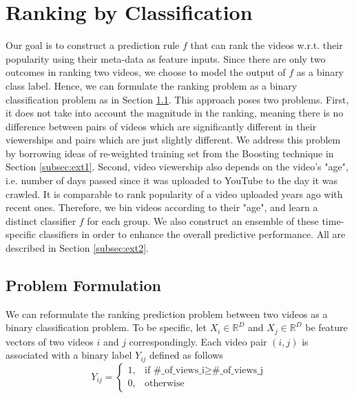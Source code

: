 \section{Ranking by Classification}
\label{sec:ranking}	
	Our goal is to construct a prediction rule $f$ that can rank the videos w.r.t. their popularity using their meta-data as feature inputs. Since there are only two outcomes in ranking two videos, we choose to model the output of $f$ as a binary class label. Hence, we can formulate the ranking problem as a binary classification problem as in Section \ref{subsec:probFormulation}. This approach poses two problems. First, it does not take into account the magnitude in the ranking, meaning there is no difference between pairs of videos which are significantly different in their viewerships and pairs which are just slightly different. We address this problem by borrowing ideas of re-weighted training set from the Boosting technique in Section \ref{subsec:ext1}. Second, video viewership also depends on the video's "age", i.e. number of days passed since it was uploaded to YouTube to the day it was crawled. It is comparable to rank popularity of a video uploaded years ago with recent ones. Therefore, we bin videos according to their "age", and learn a distinct classifier $f$ for each group. We also construct an ensemble of these time-specific classifiers in order to enhance the overall predictive performance. All are described in Section \ref{subsec:ext2}.

\subsection{Problem Formulation}
\label{subsec:probFormulation}
We can reformulate the ranking prediction problem between two videos as a binary classification problem. To be specific, let $X_i \in \mathbb{R}^D$ and $X_j \in \mathbb{R}^D$ be feature vectors of two videos $i$ and $j$ correspondingly. Each video pair $(i, j)$ is associated with a binary label $Y_{ij}$ defined as follows
	\begin{equation}
	Y_{ij} = \begin{cases}
			   1, & \text{if } \text{\#\_of\_views\_i} \geq \text{\#\_of\_views\_j} \\
			   0, & \text{otherwise}
			\end{cases} 
	\label{eqn:binaryLabel}			
	\end{equation}	

